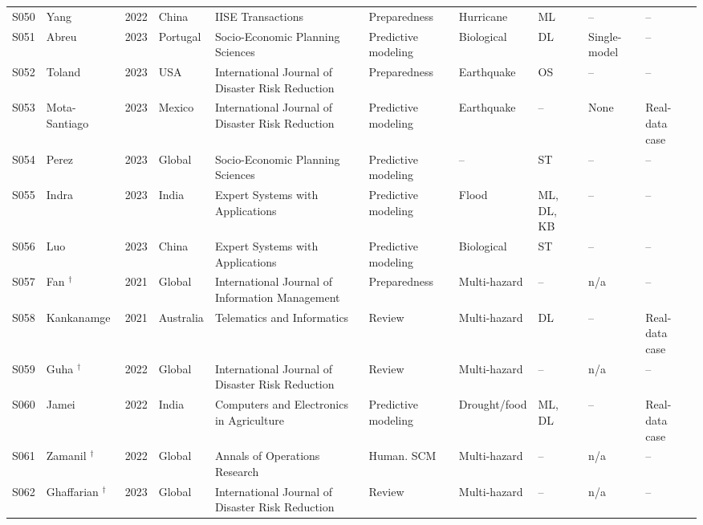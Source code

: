 \begin{landscape}
\begin{longtable}{@{}L{0.9cm}L{2.9cm}L{0.8cm}L{2.1cm}L{3.1cm}L{2.4cm}L{2.0cm}L{1.8cm}L{2.1cm}L{2.0cm}@{}}
S050 & Yang \cite{Yang2022OptimizingRelief} & 2022 & China & IISE Transactions & Preparedness & Hurricane & ML & -- & -- \\
S051 & Abreu \cite{Abreu2023Data-drivenServices} & 2023 & Portugal & Socio-Economic Planning Sciences & Predictive modeling & Biological & DL & Single-model & -- \\
S052 & Toland \cite{Toland2023ADisasters} & 2023 & USA & International Journal of Disaster Risk Reduction & Preparedness & Earthquake & OS & -- & -- \\
S053 & Mota-Santiago \cite{Mota-Santiago2023DeterminationCountriesc} & 2023 & Mexico & International Journal of Disaster Risk Reduction & Predictive modeling & Earthquake & -- & None & Real-data case \\
S054 & Perez \cite{Perez2023AnalysisDisasters} & 2023 & Global & Socio-Economic Planning Sciences & Predictive modeling & -- & ST & -- & -- \\
S055 & Indra \cite{Indra2023AnCGDNN} & 2023 & India & Expert Systems with Applications & Predictive modeling & Flood & ML, DL, KB & -- & -- \\
S056 & Luo \cite{Luo2023RecursivePerception} & 2023 & China & Expert Systems with Applications & Predictive modeling & Biological & ST & -- & -- \\
S057 & Fan \cite{Fan2021DisasterManagement}$^{\dagger}$ & 2021 & Global & International Journal of Information Management & Preparedness & Multi-hazard & -- & n/a & -- \\
S058 & Kankanamge \cite{Kankanamge2021PublicBrisbane} & 2021 & Australia & Telematics and Informatics & Review & Multi-hazard & DL & -- & Real-data case \\
S059 & Guha \cite{Guha2022ArtificialReview}$^{\dagger}$ & 2022 & Global & International Journal of Disaster Risk Reduction & Review & Multi-hazard & -- & n/a & -- \\
S060 & Jamei \cite{Jamei2022CombinedSelection} & 2022 & India & Computers and Electronics in Agriculture & Predictive modeling & Drought/food & ML, DL & -- & Real-data case \\
S061 & Zamanil \cite{Zamani2023ArtificialReview}$^{\dagger}$ & 2022 & Global & Annals of Operations Research & Human. SCM & Multi-hazard & -- & n/a & -- \\
S062 & Ghaffarian \cite{Ghaffarian2023ExplainableFutures}$^{\dagger}$ & 2023 & Global & International Journal of Disaster Risk Reduction & Review & Multi-hazard & -- & n/a & -- \\

\end{longtable}
\end{landscape}
